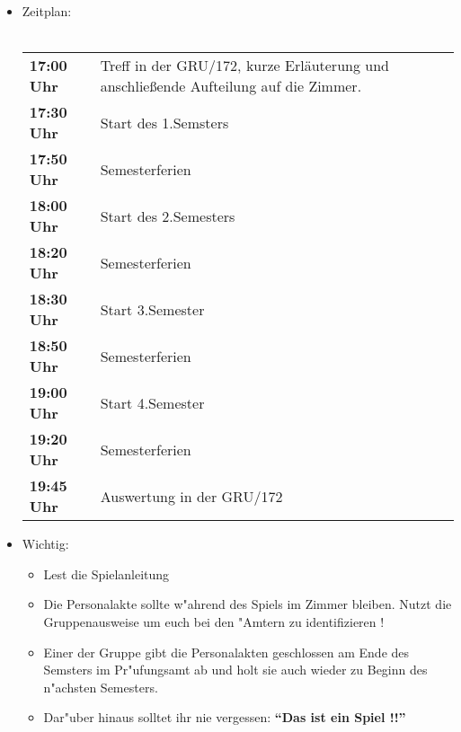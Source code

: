 \documentclass[a4paper,10pt]{report}
\begin{document}

  \begin{itemize}
    \item Zeitplan: \\\\

    \begin{tabular}{lp{7cm}}
      \textbf{17:00 Uhr} &
      Treff in der GRU/172, kurze Erl\"auterung und anschlie{\ss}ende
      Aufteilung auf die Zimmer. \\
      \textbf{17:30 Uhr} &
      Start des 1.Semsters  \\      
      \textbf{17:50 Uhr} &
      Semesterferien \\
      \textbf{18:00 Uhr} &
      Start des 2.Semesters\\
      \textbf{18:20 Uhr} &
      Semesterferien \\
      \textbf{18:30 Uhr} &
      Start 3.Semester \\
      \textbf{18:50 Uhr} &
      Semesterferien \\
      \textbf{19:00 Uhr} &
      Start 4.Semester \\
      \textbf{19:20 Uhr} &
      Semesterferien \\
      \textbf{19:45 Uhr} &
      Auswertung in der GRU/172 \\
    \end{tabular}

    \item Wichtig:
      \begin{itemize}
        \item Lest die Spielanleitung
	\item Die Personalakte sollte w"ahrend des Spiels im Zimmer bleiben.
	      Nutzt die Gruppenausweise um euch bei den "Amtern zu
              identifizieren !
	\item Einer der Gruppe gibt die Personalakten geschlossen am
	      Ende des Semsters im Pr"ufungsamt ab und holt sie auch
	      wieder zu Beginn des n"achsten Semesters.
	\item Dar"uber hinaus solltet ihr nie vergessen:
              \textbf{``Das ist ein Spiel !!''}
      \end {itemize}

  \end{itemize}
\end{document}

